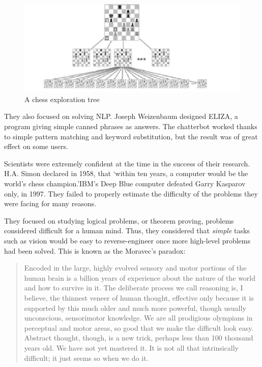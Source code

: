 \documentclass[12pt]{article}
\begin{document}
\begin{figure}[ht]
    \centering
    \includegraphics[width=\textwidth]{chess-tree}
    \caption{A chess exploration tree}
    \label{fig:chess_tree}
\end{figure}

\smallskip

They also focused on solving \gls{NLP}. Joseph Weizenbaum designed ELIZA, a
program giving simple canned phrases as answers. The chatterbot worked thanks to
simple  pattern matching and keyword substitution, but the result was of great
effect on some users.

Scientists were extremely confident at the time in the success of their research.
H.A. Simon declared in 1958, that \lq within ten years, a computer would be the
world's chess champion.\rq IBM's Deep Blue computer defeated Garry Kasparov only,
in 1997. They failed to properly estimate the difficulty of the problems they were
facing for many reasons.

They focused on studying logical problems, or theorem proving, problems considered
difficult for a human mind. Thus, they considered that {\em simple} tasks such as
vision would be easy to reverse-engineer once more high-level problems had been
solved. This is known as the Moravec's paradox:

\begin{quotation}
  Encoded in the large, highly evolved sensory and motor portions of the human
  brain is a billion years of experience about the nature of the world and how
  to survive in it. The deliberate process we call reasoning is, I believe, the
  thinnest veneer of human thought, effective only because it is supported by
  this much older and much more powerful, though usually unconscious,
  sensorimotor knowledge. We are all prodigious olympians in perceptual and
  motor areas, so good that we make the difficult look easy. Abstract thought,
  though, is a new trick, perhaps less than 100 thousand years old. We have not
  yet mastered it. It is not all that intrinsically difficult; it just seems so
  when we do it. \cite{Moravec}
\end{quotation}
\end{document}
